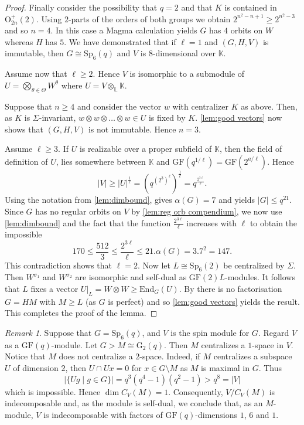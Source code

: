 \documentclass[12pt]{amsart}
\theoremstyle{remark}
\newtheorem{remark}[theorem]{Remark}
\theoremstyle{notation}
\theoremstyle{definition}
\newcommand{\G}{\mathrm{G}}
\newcommand{\GF}{\mathrm{GF}}
\newcommand{\Sp}{\mathrm{Sp}}
\newcommand{\0}{\emptyset}
\begin{document}
\begin{proof}
Finally consider the possibility that $q=2$ and that $K$ is contained in $\mathrm O_{2n}^+(2)$. Using $2$-parts of the orders of both groups we obtain   $2^{n^2-n+1} \ge 2^{n^2-3}$ and so $n=4$. In this case a {\sc Magma} calculation yields $G$ has $4$ orbits on $W$ whereas $H$ has $5$. We have demonstrated that if $\ell=1$ and $(G,H,V)$ is immutable, then $G\cong \Sp_6(q)$ and $V$ is $8$-dimensional over $\mathbb K$.

Assume now that $\ell \ge 2$. Hence $V$ is isomorphic to a submodule of $U=\bigotimes_{\theta \in \Theta} W^{\theta}$ where $U= V \otimes_{\mathbb L} \mathbb K$.


Suppose that $n \ge 4$ and consider the vector $w$ with centralizer $K$ as above. Then, as $K$ is $\Sigma$-invariant, $w\otimes w\otimes \dots\otimes w\in U$ is fixed by $K$. \cref{lem:good vectors} now shows that $(G,H,V)$ is not immutable. Hence $n=3$.


  Assume $\ell \ge 3$. If $ U$ is realizable over a proper subfield of $\mathbb K$, then the field of definition of $U$, lies somewhere between $\mathbb K$ and $\GF(q^{1/\ell})=\GF(2^{a/\ell})$.  Hence $$|V| \ge |U|^{\frac 1 \ell}= \left( q^{(2^3)^\ell}\right)^{\frac 1 \ell}= q^{\frac{2^{3\ell}}{\ell}}.$$
Using the notation from \cref{lem:dimbound}, \cite[Theorem 4.2]{GuralnickSaxl} gives $\alpha(G)=7$ and \cite[Corollary 16]{ParkerWilson} yields $|G|\le q^{21}$. Since $G$ has no regular orbits on $V$ by \cref{lem:reg orb compendium}, we now use  \cref{lem:dimbound} and the fact that the function $\frac{2^{3\ell}}{\ell}$ increases with $\ell$ to obtain the impossible
$$170\le \frac{512}{3}\le {\frac{2^{3\ell}}{\ell}} \le 21.\alpha(G)=
3.7^2= 147.$$
This contradiction shows that  $\ell=2$. Now let $L \cong \Sp_6(2)$ be centralized by $\Sigma$. Then $W^{\sigma_1} $ and $W^{\sigma_2}$ are isomorphic and self-dual as $\GF(2)L$-modules.  It follows that $L$ fixes a vector $U|_L= W\otimes W\ge \mathrm{End}_G(U)$. By \cite[Theorem A, Tables 1 \& 2  ]{LiebeckPraegerSaxl} there is no factorisation $G=HM$ with $M \ge L$ (as $G$ is perfect) and so \cref{lem:good vectors} yields the result.  This completes the proof of the lemma.
\end{proof}


\begin{remark}\label{rmk G2} Suppose that $G = \Sp_6(q)$, and $V$ is the spin module for $G$. Regard $V$ as a $\GF(q)$-module. Let $G>M \cong \G_2(q)$. Then $M$ centralizes a $1$-space in $V$. Notice that $M$ does not centralize a $2$-space. Indeed, if $M$ centralizes a subspace $U$ of dimension $2$, then $U \cap Ux=0$ for $x \in G\setminus M$ as $M$ is maximal in $G$. Thus $$|\{Ug\mid g \in G\}|= q^{3}(q^{4}-1)(q^{2}-1)>q^{8}=|V|$$ which is impossible. Hence $\dim C_V(M)=1$. Consequently, $V/C_V(M)$ is indecomposable and, as the module is self-dual, we conclude that, as an $M$-module, $V$ is indecomposable with factors of $\GF(q)$-dimensions $1$, $6$ and $1$.
\end{remark}
\end{document}
